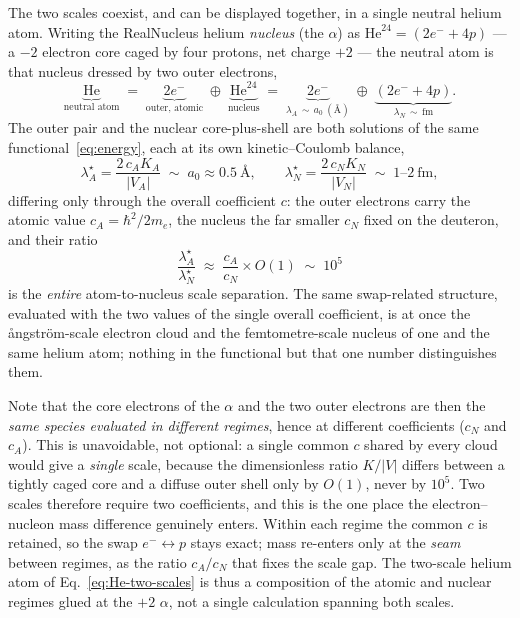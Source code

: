 \documentclass[11pt]{article}
\begin{document}
The two scales coexist, and can be displayed together, in a single neutral helium atom. Writing the
RealNucleus helium \emph{nucleus} (the $\alpha$) as $\mathrm{He}^{24}=(2e^-+4p)$ --- a $-2$ electron
core caged by four protons, net charge $+2$ --- the neutral atom is that nucleus dressed by two outer
electrons,
\begin{equation}
\underbrace{\mathrm{He}}_{\text{neutral atom}} \;=\;
\underbrace{2e^-}_{\text{outer, atomic}} \;\oplus\; \underbrace{\mathrm{He}^{24}}_{\text{nucleus}}
\;=\;
\underbrace{2e^-}_{\lambda_A\,\sim\,a_0\ (\text{\AA})} \;\oplus\;
\underbrace{(2e^- + 4p)}_{\lambda_N\,\sim\,\text{fm}} .
\label{eq:He-two-scales}
\end{equation}
The outer pair and the nuclear core-plus-shell are both solutions of the same
functional~\eqref{eq:energy}, each at its own kinetic--Coulomb balance,
\begin{equation}
\lambda_A^\star = \frac{2\,c_A K_A}{|V_A|} \;\sim\; a_0 \approx 0.5~\text{\AA},
\qquad
\lambda_N^\star = \frac{2\,c_N K_N}{|V_N|} \;\sim\; 1\text{--}2~\text{fm},
\end{equation}
differing only through the overall coefficient $c$: the outer electrons carry the atomic value
$c_A=\hbar^2/2m_e$, the nucleus the far smaller $c_N$ fixed on the deuteron, and their ratio
\begin{equation}
\frac{\lambda_A^\star}{\lambda_N^\star} \;\approx\; \frac{c_A}{c_N}\times O(1) \;\sim\; 10^{5}
\end{equation}
is the \emph{entire} atom-to-nucleus scale separation. The same swap-related structure, evaluated with
the two values of the single overall coefficient, is at once the {\aa}ngstr\"om-scale electron cloud
and the femtometre-scale nucleus of one and the same helium atom; nothing in the functional but that
one number distinguishes them.

Note that the core electrons of the $\alpha$ and the two outer electrons are then the \emph{same
species evaluated in different regimes}, hence at different coefficients ($c_N$ and $c_A$). This is
unavoidable, not optional: a single common $c$ shared by every cloud would give a \emph{single} scale,
because the dimensionless ratio $K/|V|$ differs between a tightly caged core and a diffuse outer shell
only by $O(1)$, never by $10^5$. Two scales therefore require two coefficients, and this is the one
place the electron--nucleon mass difference genuinely enters. Within each regime the common $c$ is
retained, so the swap $e^-\!\leftrightarrow p$ stays exact; mass re-enters only at the \emph{seam}
between regimes, as the ratio $c_A/c_N$ that fixes the scale gap. The two-scale helium atom of
Eq.~\eqref{eq:He-two-scales} is thus a composition of the atomic and nuclear regimes glued at the
$+2$ $\alpha$, not a single calculation spanning both scales.
\end{document}
